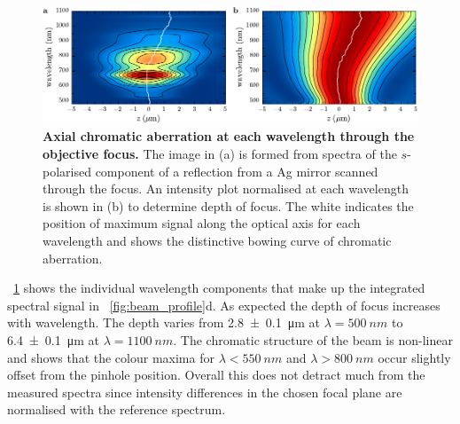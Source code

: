 \documentclass{article}
\begin{document}
\begin{figure}[bt]
\centering
\includegraphics{figures/axial_chromatic_aberration} %
\caption[Axial chromatic aberration at each wavelength through the objective focus]{\textbf{Axial chromatic aberration at each wavelength through the objective focus.} The image in (a) is formed from spectra of the $s$-polarised component of a reflection from a Ag mirror scanned through the focus. An intensity plot normalised at each wavelength is shown in (b) to determine depth of focus. The white indicates the position of maximum signal along the optical axis for each wavelength and shows the distinctive bowing curve of chromatic aberration.}
\label{fig:axial_chromatic_aberration}
\vspace{-5pt}
\end{figure}

\figurename~\ref{fig:axial_chromatic_aberration} shows the individual wavelength components that make up the integrated spectral signal in \figurename~\ref{fig:beam_profile}d. As expected the depth of focus increases with wavelength. The depth varies from \SI{2.8\pm0.1}{\micro\metre} at $\lambda=\SI{500}{nm}$ to \SI{6.4\pm0.1}{\micro\metre} at $\lambda=\SI{1100}{nm}$. The chromatic structure of the beam is non-linear and shows that the colour maxima for $\lambda<\SI{550}{nm}$ and $\lambda>\SI{800}{nm}$ occur slightly offset from the pinhole position. Overall this does not detract much from the measured spectra since intensity differences in the chosen focal plane are normalised with the reference spectrum.
\end{document}
